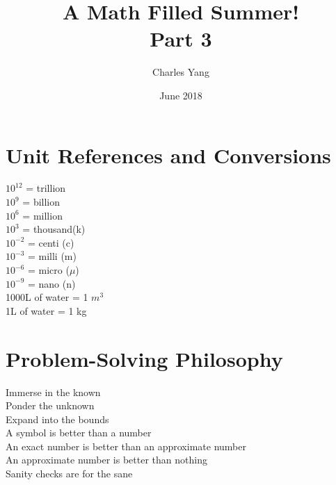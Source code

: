 \documentclass{article}
\title{%
  A Math Filled Summer! \\
  \large Part 3}
\author{Charles Yang }
\date{June 2018}
\begin{document}
\maketitle
\begin{center}
    \section*{Unit References and Conversions}
    $10^{12}$ = trillion\\
    $10^9$ = billion\\
    $10^6$ = million\\
    $10^3$ = thousand(k)\\
    $10^{-2}$ = centi (c)\\
    $10^{-3}$ = milli (m)\\
    $10^{-6}$ = micro ($\mu$)\\
    $10^{-9}$ = nano (n)\\
    1000L of water = 1 $m^3$\\
    1L of water = 1 kg\\
    
    
    \section*{Problem-Solving Philosophy}
    Immerse in the known\\
    Ponder the unknown\\
    Expand into the bounds\\
    A symbol is better than a number\\
    An exact number is better than an approximate number\\
    An approximate number is better than nothing\\
    Sanity checks are for the sane\\
    
    
\end{center}

\newpage
\end{document}

